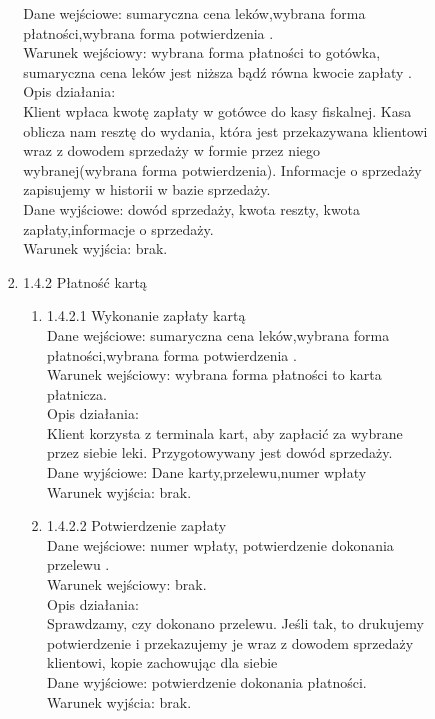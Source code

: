 \documentclass[a4paper, 11pt]{article}
\begin{document}
\begin{enumerate}
\begin{enumerate}
\begin{enumerate}
\begin{enumerate}
	Dane wejściowe: sumaryczna cena leków,wybrana forma płatności,wybrana forma potwierdzenia .\\
	Warunek wejściowy: wybrana forma płatności to gotówka, sumaryczna cena leków jest niższa bądź równa kwocie zapłaty .\\
	Opis działania:\\
		Klient wpłaca kwotę zapłaty w gotówce do kasy fiskalnej. Kasa oblicza nam resztę do wydania, która jest przekazywana klientowi wraz z dowodem sprzedaży w formie przez niego wybranej(wybrana forma potwierdzenia). Informacje o sprzedaży zapisujemy w historii w bazie sprzedaży.\\
		
	Dane wyjściowe: dowód sprzedaży, kwota reszty, kwota zapłaty,informacje o sprzedaży. \\
	Warunek wyjścia: brak.\\	
		\item 1.4.2 Płatność kartą
		\begin{enumerate}
		\item 1.4.2.1 Wykonanie zapłaty kartą\\
	Dane wejściowe: sumaryczna cena leków,wybrana forma płatności,wybrana forma potwierdzenia .\\
	Warunek wejściowy: wybrana forma płatności to karta płatnicza.\\
	Opis działania:\\
		Klient korzysta z terminala kart, aby zapłacić za wybrane przez siebie leki. Przygotowywany jest dowód sprzedaży.\\
		
	Dane wyjściowe: Dane karty,przelewu,numer wpłaty \\
	Warunek wyjścia: brak.\\	
	
		\item 1.4.2.2 Potwierdzenie zapłaty\\
	Dane wejściowe: numer wpłaty, potwierdzenie dokonania przelewu .\\
	Warunek wejściowy: brak.\\
	Opis działania:\\
		Sprawdzamy, czy dokonano przelewu. Jeśli tak, to drukujemy potwierdzenie i przekazujemy je wraz z dowodem sprzedaży klientowi, kopie zachowując dla siebie \\
		
	Dane wyjściowe: potwierdzenie dokonania płatności. \\
	Warunek wyjścia: brak.\\	
		\end{enumerate}
		\end{enumerate}
	\end{enumerate}
	

\end{enumerate}
\end{enumerate}
\end{document}
